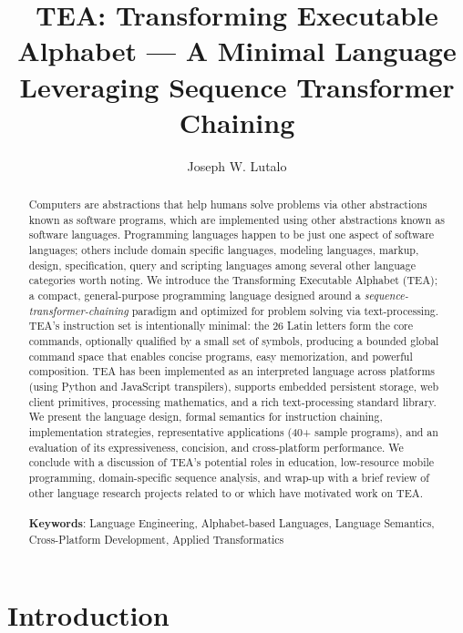 \documentclass[sigplan,screen]{acmart}
\title{TEA: Transforming Executable Alphabet --- A Minimal Language Leveraging Sequence Transformer Chaining}
\author{Joseph W. Lutalo}
\affiliation{%
  \institution{Nuchwezi Research}
  \country{Uganda}}
\begin{document}
%




\begin{abstract}
Computers are abstractions that help humans solve problems via other abstractions known as software programs, which are implemented using other abstractions known as software languages. Programming languages happen to be just one aspect of software languages; others include domain specific languages, modeling languages, markup, design, specification, query and scripting languages among several other language categories worth noting. We introduce the Transforming Executable Alphabet (TEA); a compact, general-purpose programming language designed around a \emph{sequence-transformer-chaining} paradigm and optimized for problem solving via text-processing. TEA's instruction set is intentionally minimal: the 26 Latin letters form the core commands, optionally qualified by a small set of symbols, producing a bounded global command space that enables concise programs, easy memorization, and powerful composition. TEA has been implemented as an interpreted language across platforms (using Python and JavaScript transpilers), supports embedded persistent storage, web client primitives, processing mathematics, and a rich text-processing standard library. We present the language design, formal semantics for instruction chaining, implementation strategies, representative applications (40+ sample programs), and an evaluation of its expressiveness, concision, and cross-platform performance. We conclude with a discussion of TEA's potential roles in education, low-resource mobile programming, domain-specific sequence analysis, and wrap-up with a brief review of other language research projects related to or which have motivated work on TEA.\\\\
\textbf{Keywords}: Language Engineering, Alphabet-based Languages, Language Semantics, Cross-Platform Development, Applied Transformatics
\end{abstract}


\maketitle

\section{Introduction}
\label{SEC1}
\end{document}
